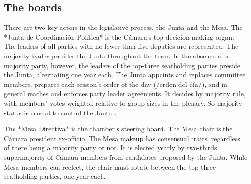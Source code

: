 \documentclass[letter,12pt]{article}
\begin{document}
  \subsection{The boards}
There are two key actors in the legislative process, the Junta and the Mesa. The *Junta de Coordinación Política* is the Cámara's top decicion-making organ. The leaders of all parties with no fewer than five deputies are represented. The majority leader presides the Junta throughout the term. In the absence of a majority party, however, the leaders of the top-three seatholding parties preside the Junta, alternating one year each. The Junta appoints and replaces committee members, prepares each session's order of the day (/orden del día/), and in general reaches and enforces party leader agreements. It decides by majority rule, with members' votes weighted relative to group sizes in the plenary. So majority status is crucial to control the Junta \citep[cf.][]{cox.mccubbins.2005}.



The *Mesa Directiva* is the chamber's steering board. The Mesa chair is the Cámara president ex-officio. The Mesa makeup has consensual traits, regardless of there being a majority party or not. It is elected yearly by two-thirds supermajority of Cámara members from candidates proposed by the Junta. While Mesa members can reelect, the chair must rotate between the top-three seatholding parties, one year each. 


\end{document}
